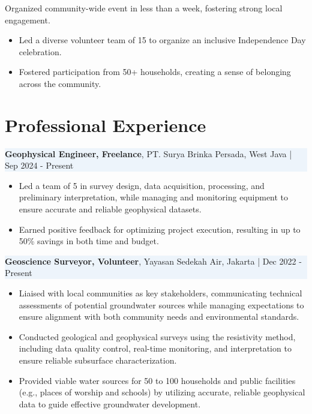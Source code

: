 \documentclass[10.5pt,a4paper]{article}
\begin{document}
Organized community-wide event in less than a week, fostering strong local engagement.
\begin{itemize}[left=1.5em, noitemsep, topsep=0pt]
  \item Led a diverse volunteer team of 15 to organize an inclusive Independence Day celebration.
  \item Fostered participation from 50+ households, creating a sense of belonging across the community.
\end{itemize}



\section*{Professional Experience}

\setlength{\fboxsep}{0pt}%
\colorbox[HTML]{EDF4FB}{%
  \parbox{\linewidth}{%
    \textbf{Geophysical Engineer, Freelance},  PT. Surya Brinka Persada, West Java \quad | \quad Sep 2024 - Present%
  }%
}
\begin{itemize}[left=1.5em, noitemsep, topsep=0pt]
    \item Led a team of 5 in survey design, data acquisition, processing, and preliminary interpretation, while managing and monitoring equipment to ensure accurate and reliable geophysical datasets.
    \item Earned positive feedback for optimizing project execution, resulting in up to 50\% savings in both time and budget.  
\end{itemize}

\vspace{0.5em}

\setlength{\fboxsep}{0pt}%
\colorbox[HTML]{EDF4FB}{%
  \parbox{\linewidth}{%
    \textbf{Geoscience Surveyor, Volunteer}, Yayasan Sedekah Air, Jakarta \quad | \quad Dec 2022 - Present%
  }%
}

\begin{itemize}[left=1.5em, noitemsep, topsep=0pt]
    \item Liaised with local communities as key stakeholders, communicating technical assessments of potential groundwater sources while managing expectations to ensure alignment with both community needs and environmental standards.
    \item Conducted geological and geophysical surveys using the resistivity method, including data quality control, real-time monitoring, and interpretation to ensure reliable subsurface characterization.
    \item Provided viable water sources for 50 to 100 households and public facilities (e.g., places of worship and schools) by utilizing accurate, reliable geophysical data to guide effective groundwater development.
  \end{itemize}
\end{document}
